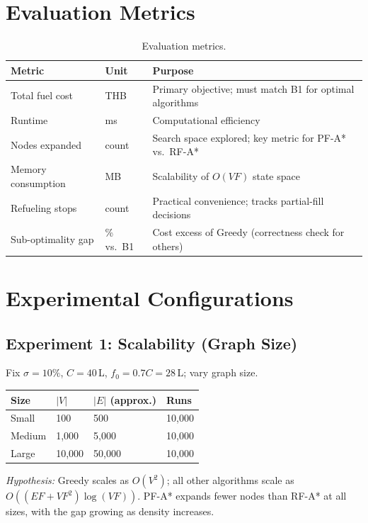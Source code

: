 \section{Evaluation Metrics}

\begin{table}[ht]
\centering
\caption{Evaluation metrics.}
\label{tab:metrics}
\begin{tabular}{lll}
\toprule
Metric & Unit & Purpose \\
\midrule
Total fuel cost      & THB   & Primary objective; must match B1 for optimal algorithms \\
Runtime              & ms    & Computational efficiency \\
Nodes expanded       & count & Search space explored; key metric for PF-A* vs.\ RF-A* \\
Memory consumption   & MB    & Scalability of $O(VF)$ state space \\
Refueling stops     & count & Practical convenience; tracks partial-fill decisions \\
Sub-optimality gap    & \% vs.\ B1 & Cost excess of Greedy (correctness check for others) \\
\bottomrule
\end{tabular}
\end{table}

\section{Experimental Configurations}

\subsection{Experiment 1: Scalability (Graph Size)}

Fix $\sigma=10\%$, $C=40$\,L, $f_0=0.7C=28$\,L; vary graph size.

\begin{center}
\begin{tabular}{llll}
\toprule
Size & $|V|$ & $|E|$ (approx.) & Runs \\
\midrule
Small  & 100    & 500    & 10,000 \\
Medium & 1,000  & 5,000  & 10,000 \\
Large  & 10,000 & 50,000 & 10,000 \\
\bottomrule
\end{tabular}
\end{center}

\textit{Hypothesis:} Greedy scales as $O(V^{2})$; all other algorithms scale as
$O((EF+VF^{2})\log(VF))$.
PF-A* expands fewer nodes than RF-A* at all sizes, with the gap growing as density
increases.

